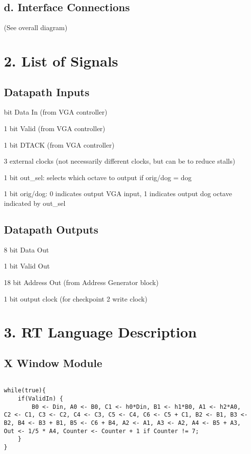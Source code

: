 \documentclass[11pt]{article}
\begin{document}
\subsection*{d. Interface Connections}

(See overall diagram)

\section*{2. List of Signals}

\subsection*{Datapath Inputs}

 bit Data In (from VGA controller)

1 bit Valid  (from VGA controller)

1 bit DTACK (from VGA controller)

3 external clocks (not necessarily different clocks, but can be to reduce stalls)

1 bit out\_sel: selects which octave to output if orig/dog = dog

1 bit orig/dog: 0 indicates output VGA input, 1 indicates output dog octave indicated by out\_sel

\subsection*{Datapath Outputs}

8 bit Data Out

1 bit Valid Out

18 bit Address Out (from Address Generator block)

1 bit output clock (for checkpoint 2 write clock)

\section*{3. RT Language Description}

\subsection*{X Window Module}
\begin{lstlisting}

while(true){
    if(ValidIn) {
        B0 <- Din, A0 <- B0, C1 <- h0*Din, B1 <- h1*B0, A1 <- h2*A0, C2 <- C1, C3 <- C2, C4 <- C3, C5 <- C4, C6 <- C5 + C1, B2 <- B1, B3 <- B2, B4 <- B3 + B1, B5 <- C6 + B4, A2 <- A1, A3 <- A2, A4 <- B5 + A3, Out <- 1/5 * A4, Counter <- Counter + 1 if Counter != 7;
    }
}
\end{lstlisting}
\end{document}
